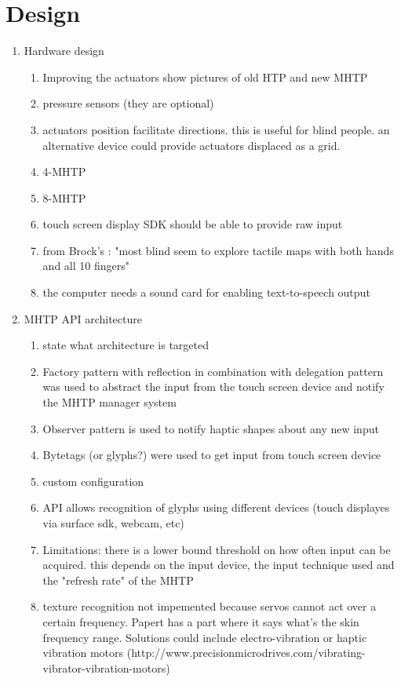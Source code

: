 \chapter{Design}

\begin{enumerate}
	\item Hardware design
    	\begin{enumerate}
        	\item Improving the actuators
            	show pictures of old HTP and new MHTP
            \item pressure sensors (they are optional)
            \item actuators position facilitate directions. this is useful for blind people. an alternative device could provide actuators displaced as a grid.
            \item 4-MHTP
            \item 8-MHTP
            \item touch screen display SDK should be able to provide raw input
            \item from Brock's : "most blind seem to explore tactile maps with both hands and all 10 fingers"
            \item the computer needs a sound card for enabling text-to-speech output
        \end{enumerate}
	\item MHTP API architecture
    	\begin{enumerate}
        	\item state what architecture is targeted
        	\item Factory pattern with reflection in combination with delegation pattern was used to abstract the input from the touch screen device and notify the MHTP manager system
            \item Observer pattern is used to notify haptic shapes about any new input
            \item Bytetags (or glyphs?) were used to get input from touch screen device
            \item custom configuration
            \item API allows recognition of glyphs using different devices (touch displayes via surface sdk, webcam, etc)
            \item Limitations: there is a lower bound threshold on how often input can be acquired. this depends on the input device, the input technique used and the "refresh rate" of the MHTP
            \item texture recognition not impemented because servos cannot act over a certain frequency. Papert \cite{brown2005first} has a part where it says what's the skin frequency range. Solutions could include electro-vibration or haptic vibration motors (http://www.precisionmicrodrives.com/vibrating-vibrator-vibration-motors)

\end{enumerate}
\end{enumerate}
